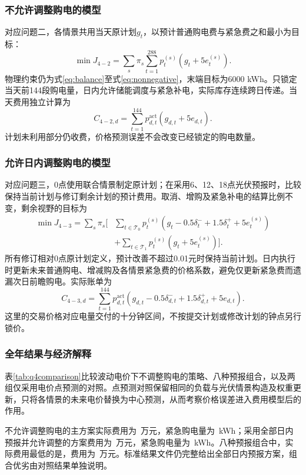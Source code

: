 \subsubsection{不允许调整购电的模型}
对应问题二，各情景共用当天原计划$g_t$，以预计普通购电费与紧急费之和最小为目标：
\begin{equation}
\min J_{4-2}=\sum_s\pi_s\sum_{t=1}^{288}
p_t^{(s)}\left(g_t+5e_t^{(s)}\right).
\label{eq:q4two}
\end{equation}
物理约束仍为式\eqref{eq:balance}至式\eqref{eq:nonnegative}，末端目标为6000 kWh。只锁定当天前144段购电量，日内允许储能调度与紧急补电，实际库存连续跨日传递。当天费用独立计算为
\begin{equation}
C_{4-2,d}=\sum_{t=1}^{144}p_{d,t}^{\mathrm{act}}
\left(g_{d,t}+5e_{d,t}\right).
\end{equation}
计划未利用部分仍收费，价格预测误差不会改变已经锁定的购电数量。

\subsubsection{允许日内调整购电的模型}
对应问题三，0点使用联合情景制定原计划；在采用6、12、18点光伏预报时，比较保持当前计划与修订剩余计划的预计费用。取消、增购及紧急补电的结算比例不变，剩余视野的目标为
\begin{align}
\min J_{4-3}=\sum_s\pi_s\bigg[&
\sum_{t\in\mathcal T_0}p_t^{(s)}
\left(g_t-0.5\delta_t^-+1.5\delta_t^++5e_t^{(s)}\right)\nonumber\\
&+\sum_{t\in\mathcal T_1}p_t^{(s)}
\left(g_t+5e_t^{(s)}\right)\bigg].
\end{align}
所有修订相对0点原计划定义，预计改善不超过0.01元时保持当前计划。日内执行时更新未来普通购电、增减购及各情景紧急费的价格系数，避免仅更新紧急费而遗漏次日前瞻购电。实际账单为
\begin{equation}
C_{4-3,d}=\sum_{t=1}^{144}p_{d,t}^{\mathrm{act}}
\left(g_{d,t}-0.5\delta_{d,t}^-+1.5\delta_{d,t}^++5e_{d,t}\right).
\label{eq:q4bill}
\end{equation}
这里的交易价格对应电量交付的十分钟区间，不按提交计划或修改计划的钟点另行锁价。

\subsubsection{全年结果与经济解释}
表\ref{tab:q4comparison}比较波动电价下不调整购电的策略、八种预报组合，以及两组仅采用电价点预测的对照。点预测对照保留相同的负载与光伏情景构造及权重更新，只将各情景的未来电价替换为中心预测，从而考察价格误差进入费用模型后的作用。
\begin{table}[htbp]\centering\scriptsize
\caption{波动电价下334天的策略比较（电量单位：kWh）}\label{tab:q4comparison}
\resizebox{\textwidth}{!}{}
\end{table}
不允许调整购电的主方案实际费用为\QfourTwoCost\ 万元，紧急购电量为\QfourTwoEmergency\ kWh；采用全部日内预报并允许调整的方案费用为\QfourThreeCost\ 万元，紧急购电量为\QfourThreeEmergency\ kWh。八种预报组合中，实际费用最低的是\QfourBestName，费用为\QfourBestCost\ 万元。标准结果文件仍完整给出全部日内预报方案，组合优劣由对照结果单独说明。

